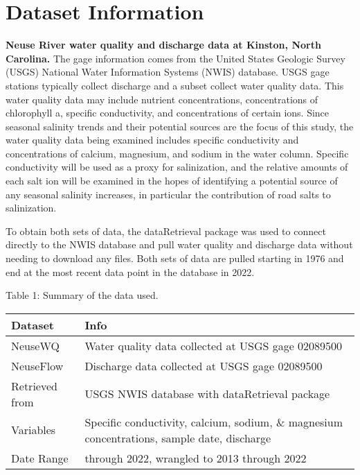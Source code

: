 \documentclass[
  12pt,
]{article}
\begin{document}
\newpage

\hypertarget{dataset-information}{%
\section{Dataset Information}\label{dataset-information}}

\textbf{Neuse River water quality and discharge data at Kinston, North
Carolina.} The gage information comes from the United States Geologic
Survey (USGS) National Water Information Systems (NWIS) database. USGS
gage stations typically collect discharge and a subset collect water
quality data. This water quality data may include nutrient
concentrations, concentrations of chlorophyll a, specific conductivity,
and concentrations of certain ions. Since seasonal salinity trends and
their potential sources are the focus of this study, the water quality
data being examined includes specific conductivity and concentrations of
calcium, magnesium, and sodium in the water column. Specific
conductivity will be used as a proxy for salinization, and the relative
amounts of each salt ion will be examined in the hopes of identifying a
potential source of any seasonal salinity increases, in particular the
contribution of road salts to salinization.

To obtain both sets of data, the dataRetrieval package was used to
connect directly to the NWIS database and pull water quality and
discharge data without needing to download any files. Both sets of data
are pulled starting in 1976 and end at the most recent data point in the
database in 2022.

Table 1: Summary of the data used.

\begin{longtable}[]{@{}
  >{\raggedright\arraybackslash}p{}
  >{\raggedright\arraybackslash}p{}@{}}
\toprule
Dataset & Info \\
\midrule
\endhead
NeuseWQ & Water quality data collected at USGS gage 02089500 \\
NeuseFlow & Discharge data collected at USGS gage 02089500 \\
Retrieved from & USGS NWIS database with dataRetrieval package \\
Variables & Specific conductivity, calcium, sodium, \& magnesium
concentrations, sample date, discharge \\
Date Range & 1976 through 2022, wrangled to 2013 through 2022 \\
\bottomrule
\end{longtable}
\end{document}
